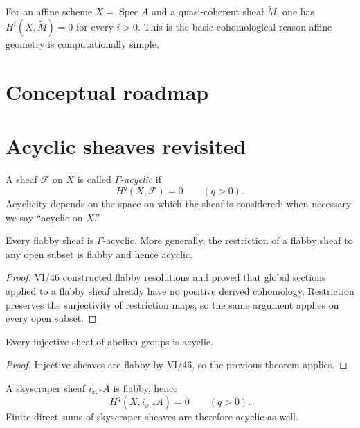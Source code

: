 \begin{example}\label{ex:vi49-expand-01}
For an affine scheme $X=\operatorname{Spec}A$ and a quasi-coherent sheaf $\widetilde M$, one has $H^i(X,\widetilde M)=0$ for every $i>0$.  This is the basic cohomological reason affine geometry is computationally simple.
\end{example}
\section*{Conceptual roadmap}


\section{Acyclic sheaves revisited}
\begin{definition}\label{def:vi49-acyclic}
A sheaf $\mathcal F$ on $X$ is called \emph{$\Gamma$-acyclic} if
\[
H^q(X,\mathcal F)=0\qquad(q>0).
\]
Acyclicity depends on the space on which the sheaf is considered; when necessary we say ``acyclic on $X$.''
\end{definition}


\begin{theorem}\label{thm:vi49-flabby-vanish}
Every flabby sheaf is $\Gamma$-acyclic. More generally, the restriction of a flabby sheaf to any open subset is flabby and hence acyclic.
\begin{proof}
VI/46 constructed flabby resolutions and proved that global sections applied to a flabby sheaf already have no positive derived cohomology. Restriction preserves the surjectivity of restriction maps, so the same argument applies on every open subset.
\end{proof}
\end{theorem}

\begin{corollary}\label{cor:vi49-injective-vanish}
Every injective sheaf of abelian groups is acyclic.
\begin{proof}
Injective sheaves are flabby by VI/46, so the previous theorem applies.
\end{proof}
\end{corollary}

\begin{example}\label{ex:vi49-skyscraper-vanish}
A skyscraper sheaf $i_{x,*}A$ is flabby, hence
\[
H^q(X,i_{x,*}A)=0\qquad(q>0).
\]
Finite direct sums of skyscraper sheaves are therefore acyclic as well.
\end{example}

